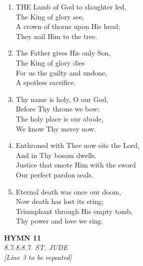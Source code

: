 \begin{enumerate}
    \item THE Lamb of God to slaughter led, \\
        The King of glory see, \\
        A crown of thorns upon His head; \\
        They nail Him to the tree.

    \item The Father gives His only Son, \\
        The King of glory dies \\
        For us the guilty and undone, \\
        A spotless sacrifice.

    \item Thy name is holy, O our God, \\
        Before Thy throne we bow; \\
        The holy place is our abode, \\
        We know Thy mercy now.

    \item Enthroned with Thee now sits the Lord, \\
        And in Thy bosom dwells. \\
        Justice that smote Him with the sword \\
        Our perfect pardon seals.

    \item Eternal death was once our doom, \\
        Now death has lost its sting; \\
        Triumphant through His empty tomb, \\
        Thy power and love we sing.

\end{enumerate}

\newpage
\begin{center}
    {\Large \textbf{HYMN 11}}
    \\
    \textit{8.7.8.8.7. ST. JUDE}
    \\
    \textit{\small [Line 3 to be repeated]}
\end{center}
\vspace{1em}

